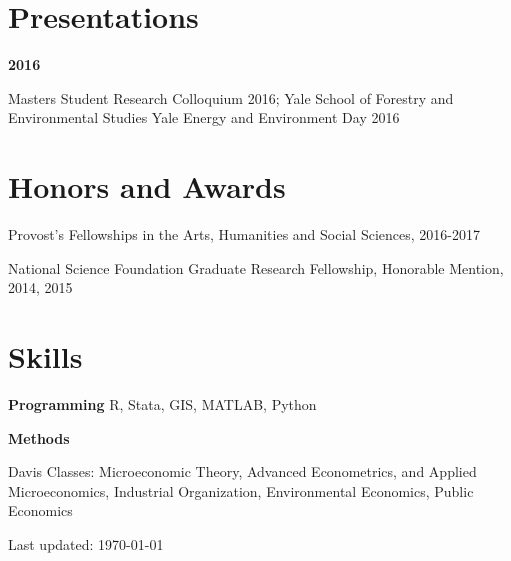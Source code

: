 \documentclass[letterpaper]{article}
\renewenvironment{itemize}{
  \begin{list}{}{
    \setlength{\leftmargin}{1.5em}
  }
}{
  \end{list}
}
\begin{document}
\section*{Presentations}
%

\begin{itemize}
\item {\bf 2016}

\leftskip 0.5in
\parindent -0.5in
\subitem Masters Student Research Colloquium 2016; Yale School of Forestry and Environmental Studies
\subitem Yale Energy and Environment Day 2016
\end{itemize}

\section*{Honors and Awards}

\begin{itemize}
  \item Provost's Fellowships in the Arts, Humanities and Social Sciences, 2016-2017
  \item National Science Foundation Graduate Research Fellowship, Honorable Mention, 2014, 2015
\end{itemize}

\section*{Skills}
\begin{itemize}
\item {\bf Programming}
\subitem R, Stata, GIS, MATLAB, Python
\item {\bf Methods}

\leftskip 0.5in
\parindent -0.5in

\subitem Davis Classes: Microeconomic Theory, Advanced Econometrics, and Applied Microeconomics, Industrial Organization, Environmental Economics, Public Economics

\end{itemize}

\medskip

\begin{center}
  \begin{footnotesize}
    Last updated: \today \\
  \end{footnotesize}
\end{center}
\end{document}
